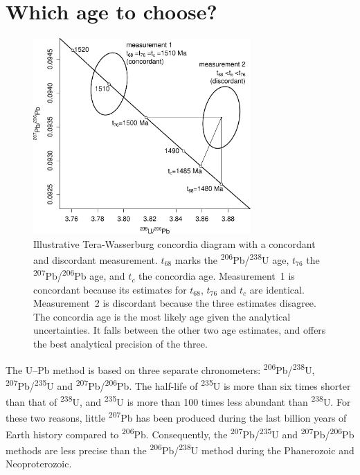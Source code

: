 \documentclass{article}
\begin{document}
\section{Which age to choose?}\label{sec:whichage}

\begin{figure}[t]
  \includegraphics[width=8.3cm]{TW1500.pdf}
  \caption{Illustrative Tera-Wasserburg concordia diagram with a
    concordant and discordant measurement. $t_{68}$ marks the
    \textsuperscript{206}Pb/\textsuperscript{238}U age, $t_{76}$ the
    \textsuperscript{207}Pb/\textsuperscript{206}Pb age, and $t_{c}$
    the concordia age. Measurement~1 is concordant because its
    estimates for $t_{68}$, $t_{76}$ and $t_{c}$ are
    identical. Measurement~2 is discordant because the three estimates
    disagree. The concordia age is the most likely age given the
    analytical uncertainties. It falls between the other two age
    estimates, and offers the best analytical precision of the
    three.}
  \label{fig:concordia}
\end{figure}

The U--Pb method is based on three separate chronometers:
\textsuperscript{206}Pb/\textsuperscript{238}U,
\textsuperscript{207}Pb/\textsuperscript{235}U and
\textsuperscript{207}Pb/\textsuperscript{206}Pb. The half-life of
\textsuperscript{235}U is more than six times shorter than that of
\textsuperscript{238}U, and \textsuperscript{235}U is more than 100
times less abundant than \textsuperscript{238}U. For these two
reasons, little \textsuperscript{207}Pb has been produced during the
last billion years of Earth history compared to
\textsuperscript{206}Pb. Consequently, the
\textsuperscript{207}Pb/\textsuperscript{235}U and
\textsuperscript{207}Pb/\textsuperscript{206}Pb methods are less
precise than the \textsuperscript{206}Pb/\textsuperscript{238}U method
during the Phanerozoic and Neoproterozoic.
\end{document}
